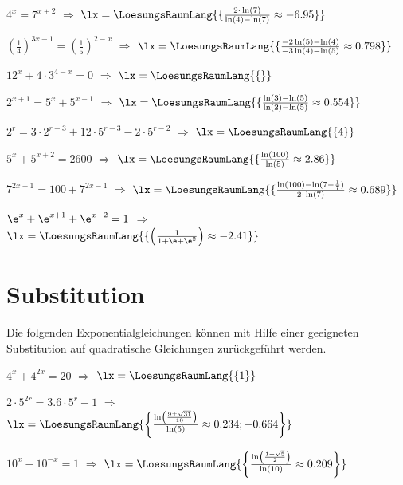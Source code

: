 \begin{bbwAufgabenBlock}
\item $4^x=7^{x+2}$ $\Longrightarrow$ $\lx=\LoesungsRaumLang{\{\frac{2\cdot{}\ln(7)}{\ln(4)-\ln(7)} \approx -6.95   \}}$ 
\item $\left(\frac14\right)^{3x-1} = \left(\frac15\right)^{2-x}$ $\Longrightarrow$ $\lx=\LoesungsRaumLang{\{\frac{-2\ln(5)-\ln(4)}{-3\ln(4)-\ln(5)} \approx 0.798   \}}$ \noTRAINER{\seitenUmbruchImAufgabenteil{}}
\item $12^x+4\cdot{}3^{4-x}=0$ $\Longrightarrow$
$\lx=\LoesungsRaumLang{\{   \}}$   
\item $2^{x+1}=5^x + 5^{x-1}$ $\Longrightarrow$ $\lx=\LoesungsRaumLang{\{\frac{\ln(3)-\ln(5)}{\ln(2)-\ln(5)} \approx 0.554   \}}$  \noTRAINER{\seitenUmbruchImAufgabenteil{}}
\item $2^r=3\cdot{}2^{r-3} + 12\cdot{}5^{r-3} - 2\cdot{}5^{r-2}$ $\Longrightarrow$ $\lx=\LoesungsRaumLang{\{ 4 \}}$ 
\item $5^x + 5^{x+2} = 2600$ $\Longrightarrow$ $\lx=\LoesungsRaumLang{\{\frac{\ln(100)}{\ln(5)} \approx 2.86   \}}$  \noTRAINER{\seitenUmbruchImAufgabenteil{}}
\item $7^{2x+1} = 100 + 7^{2x-1}$ $\Longrightarrow$ $\lx=\LoesungsRaumLang{\{\frac{\ln(100) - \ln(7-\frac17)}{2\cdot{}\ln(7)} \approx  0.689  \}}$ 
\item $\e^x + \e^{x+1} + \e^{x+2} = 1$ $\Longrightarrow$ $\lx=\LoesungsRaumLang{\{\left(\frac{1}{1+\e+\e^2}\right) \approx -2.41  \}}$ 

\end{bbwAufgabenBlock}

\newpage{}%

\section{Substitution}
Die folgenden Exponentialgleichungen können mit Hilfe einer geeigneten
Substitution auf quadratische Gleichungen zurückgeführt werden.

\begin{bbwAufgabenBlock}
\item $4^x + 4^{2x} = 20$ $\Longrightarrow$ $\lx=\LoesungsRaumLang{\{  1   \}}$ 
\item $2\cdot{}5^{2r} = 3.6\cdot{}5^r - 1$ $\Longrightarrow$
$\lx=\LoesungsRaumLang{\left\{   \frac{\ln\left(\frac{9\pm\sqrt{31}}{10}\right)}{\ln(5)} \approx
0.234; -0.664 \right\}
}$

\noTRAINER{\seitenUmbruchImAufgabenteil{}}

\item $10^x - 10^{-x} = 1$ $\Longrightarrow$ $\lx=\LoesungsRaumLang{\left\{  \frac{\ln\left(\frac{1+\sqrt{5}}{2}\right)}{\ln(10)} \approx  0.209   \right\}}$ 

\end{bbwAufgabenBlock}
\platzFuerBerechnungenBisEndeSeite{}

